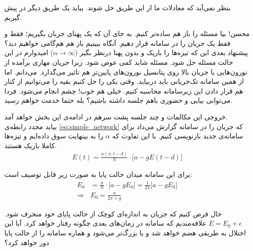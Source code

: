 
بنظر نمی‌آید که معادلات ما از این طریق حل شوند. بیاید یک طریق دیگر در پیش گیریم.

\begin{meeting}
	
	محسن! بیا مسئله را باز هم ساده‌تر کنیم. به جای آن که یک پهنای جریان بگیریم؛ فقط و فقط یک جریان را در سامانه قرار دهیم. آنگاه ببینیم باز هم هم‌گامی خواهیم دید؟\\
	پیشنهاد بعدی این که تیزه‌ها را باریک و بدون پهنا درنظر بگیر
	($\alpha \rightarrow \infty$)
	امیدوارم در این حالت مسئله حل شود.
	\medskip
	مسئله شاید کمی عوض شود. زیرا جریان مهاری برآمده از نورون‌هایی با جریان بالا روی پتانسیل نورون‌های پایین‌تر هم تاثیر می‌گذارد.
	می‌دانم. اما از همین سامانه تک‌جریانی باید دربیاید. وقتی یکی را حل کنیم بقیه را می‌توانیم از کنار هم قرار دادن این زیرسامانه محاسبه کنیم.
	خیلی هم خوب! چشم انجام می‌شود.
	فردا می‌توانی بیایی و حضوری باهم جلسه داشته باشیم؟
	بله حتما خدمت خواهم رسید.
	
\end{meeting}
خروجی این مکالمات و چند جلسه پشت سرهم در ادامه‌ی این بخش خواهد آمد.\\

بیاید مجدد رابطه‌ی 
\ref{eq:simple_network}
که جریان را در سامانه گزارش می‌داد برای سامانه‌ی جدید بازنویسی کنیم. با این تفاوت که $\alpha$ را به بینهایت سوق داده‌ایم و تیزه‌ها کاملا باریک هستند.
\begin{align}
	E(t) = \frac{n(\pi,t-d)}{N} \cdot \big[ a - g E(t-d) \big]
\end{align}

برای این سامانه میدان حالت پایا به صورت زیر قابل توصیف است:
\begin{align}
	E_0 &= \frac{n}{N} \cdot \big[ a - g E_0 \big] = \frac{1}{2\pi}\big[ a - g E_0 \big]\\
	\Rightarrow  & E_0 = \frac{a}{2\pi + g}
\end{align}

حال فرض کنیم که جریان به اندازه‌ای کوچک از حالت پایای خود منحرف ‌شود.
$E = E_0 + \epsilon$
علاقه‌مندیم که سامانه در زمان‌های بعدی چگونه رفتار خواهد کرد. آیا این اختلال به طریقی هضم خواهد شد و یا بزرگ‌تر می‌شود و هماره سامانه را از حالت پایا دور خواهد کرد؟

